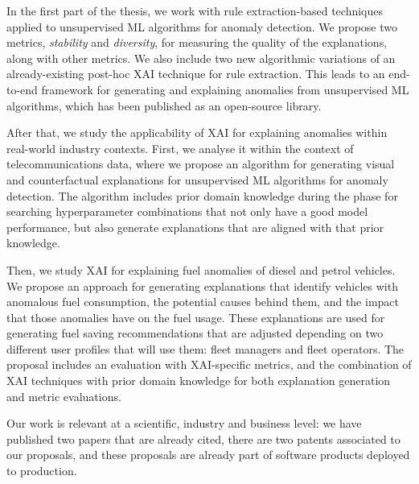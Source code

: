     In the first part of the thesis, we work with rule extraction-based techniques applied to unsupervised ML algorithms for anomaly detection. We propose two metrics, \textit{stability} and \textit{diversity}, for measuring the quality of the explanations, along with other metrics. We also include two new algorithmic variations of an already-existing post-hoc XAI technique for rule extraction. This leads to an end-to-end framework for generating and explaining anomalies from unsupervised ML algorithms, which has been published as an open-source library.
    
    After that, we study the applicability of XAI for explaining anomalies within real-world industry contexts. First, we analyse it within the context of telecommunications data, where we propose an algorithm for generating visual and counterfactual explanations for unsupervised ML algorithms for anomaly detection. The algorithm includes prior domain knowledge during the phase for searching hyperparameter combinations that not only have a good model performance, but also generate explanations that are aligned with that prior knowledge. 
    
    Then, we study XAI for explaining fuel anomalies of diesel and petrol vehicles. We propose an approach for generating explanations that identify vehicles with anomalous fuel consumption, the potential causes behind them, and the impact that those anomalies have on the fuel usage. These explanations are used for generating fuel saving recommendations that are adjusted depending on two different user profiles that will use them: fleet managers and fleet operators. The proposal includes an evaluation with XAI-specific metrics, and the combination of XAI techniques with prior domain knowledge for both explanation generation and metric evaluations. 
    
    Our work is relevant at a scientific, industry and business level: we have published two papers that are already cited, there are two patents associated to our proposals, and these proposals are already part of software products deployed to production.
    


{}

\newpage
